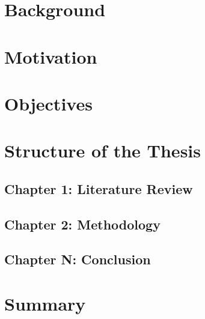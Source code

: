 \section{Background}

\section{Motivation}

\section{Objectives}

\section{Structure of the Thesis}

\subsection{Chapter 1: Literature Review}

\subsection{Chapter 2: Methodology}



\subsection{Chapter N: Conclusion}


\section{Summary}

